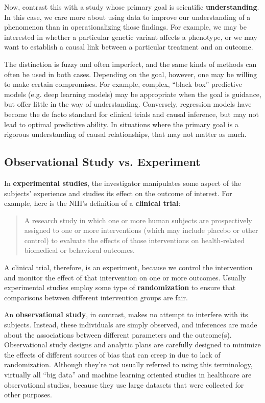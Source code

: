 Now, contrast this with a study whose primary goal is scientific \textbf{understanding}. In this case, we care more about using data to improve our understanding of a phenomenon than in operationalizing those findings. For example, we may be interested in whether a particular genetic variant affects a phenotype, or we may want to establish a causal link between a particular treatment and an outcome. 

The distinction is fuzzy and often imperfect, and the same kinds of methods can often be used in both cases. Depending on the goal, however, one may be willing to make certain compromises. For example, complex, ``black box'' predictive models (e.g. deep learning models) may be appropriate when the goal is guidance, but offer little in the way of understanding. Conversely, regression models have become the de facto standard for clinical trials and causal inference, but may not lead to optimal predictive ability. In situations where the primary goal is a rigorous understanding of causal relationships, that may not matter as much.

\subsection{Observational Study vs. Experiment}

In \textbf{experimental studies}, the investigator manipulates some aspect of the subjects' experience and studies its effect on the outcome of interest. For example, here is the NIH's definition of a \textbf{clinical trial}:
\begin{quote}
A research study in which one or more human subjects are prospectively assigned to one or more interventions (which may include placebo or other control) to evaluate the effects of those interventions on health-related biomedical or behavioral outcomes.
\end{quote}
A clinical trial, therefore, is an experiment, because we control the intervention and monitor the effect of that intervention on one or more outcomes. Usually experimental studies employ some type of \textbf{randomization} to ensure that comparisons between different intervention groups are fair. 

An \textbf{observational study}, in contrast, makes no attempt to interfere with its subjects. Instead, these individuals are simply observed, and inferences are made about the associations between different parameters and the outcome(s). Observational study designs and analytic plans are carefully designed to minimize the effects of different sources of bias that can creep in due to lack of randomization. Although they're not usually referred to using this terminology, virtually all ``big data'' and machine learning oriented studies in healthcare are observational studies, because they use large datasets that were collected for other purposes.

